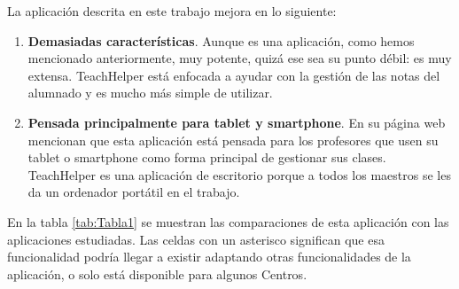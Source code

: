 La aplicación descrita en este trabajo mejora en lo siguiente:

\begin{enumerate}
	\item \textbf{Demasiadas características}. Aunque es una aplicación, como hemos mencionado anteriormente, muy potente, quizá ese sea su punto débil: es muy extensa. TeachHelper está enfocada a ayudar con la gestión de las notas del alumnado y es mucho más simple de utilizar.
	\item \textbf{Pensada principalmente para tablet y smartphone}. En su página web mencionan que esta aplicación está pensada para los profesores que usen su tablet o smartphone como forma principal de gestionar sus clases. TeachHelper es una aplicación de escritorio porque a todos los maestros se les da un ordenador portátil en el trabajo.

\end{enumerate}




En la tabla \ref{tab:Tabla1} se muestran las comparaciones de esta aplicación con las aplicaciones estudiadas. Las celdas con un asterisco significan que esa funcionalidad podría llegar a existir adaptando otras funcionalidades de la aplicación, o solo está disponible para algunos Centros.

